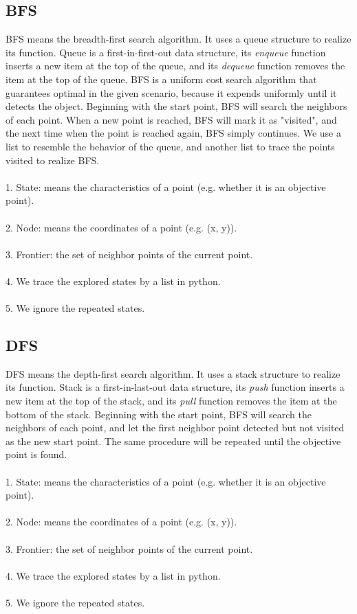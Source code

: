 \documentclass{mcmthesis}
\begin{document}
\subsection{BFS}
BFS means the breadth-first search algorithm. It uses a queue structure to realize its function. Queue is a first-in-first-out data structure, its \textit{enqueue} function inserts a new item at the top of the queue, and its \textit{dequeue} function removes the item at the top of the queue. BFS is a uniform cost search algorithm that guarantees optimal in the given scenario, because it expends uniformly until it detects the object. Beginning with the start point, BFS will search the neighbors of each point. When a new point is reached, BFS will mark it as "visited", and the next time when the point is reached again, BFS simply continues. We use a list to resemble the behavior of the queue, and another list to trace the points visited to realize BFS.\\
\\
1. State: means the characteristics of a point (e.g. whether it is an objective point).
\\
\\
2. Node: means the coordinates of a point (e.g. (x, y)).
\\
\\
3. Frontier: the set of neighbor points of the current point.
\\
\\
4. We trace the explored states by a list in python.
\\
\\
5. We ignore the repeated states.
\subsection{DFS}
DFS means the depth-first search algorithm. It uses a stack structure to realize its function. Stack is a first-in-last-out data structure, its \textit{push} function inserts a new item at the top of the stack, and its \textit{pull} function removes the item at the bottom of the stack. Beginning with the start point, BFS will search the neighbors of each point, and let the first neighbor point detected but not visited as the new start point. The same procedure will be repeated until the objective point is found. \\
\\
1. State: means the characteristics of a point (e.g. whether it is an objective point).
\\
\\
2. Node: means the coordinates of a point (e.g. (x, y)).
\\
\\
3. Frontier: the set of neighbor points of the current point.
\\
\\
4. We trace the explored states by a list in python.
\\
\\
5. We ignore the repeated states.
\end{document}
